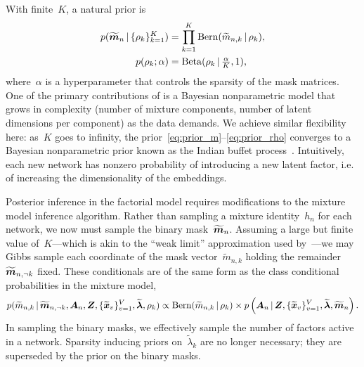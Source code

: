 With finite~$K$, a natural prior is
\begin{align}
  \label{eq:prior_m}
  p(\widetilde{\boldsymbol{m}}_n \, | \, \{\rho_k\}_{k=1}^K)
  &=\prod_{k=1}^K \mathrm{Bern}(\widetilde{m}_{n,k} \, | \, \rho_k), \\
  \label{eq:prior_rho}
  p(\rho_k; \alpha) &= \mathrm{Beta}(\rho_k \, | \, \tfrac{\alpha}{K}, 1), 
\end{align}
where~$\alpha$ is a hyperparameter that controls the sparsity of the
mask matrices.  One of the primary contributions of
\citet{durante2016nonparametric} is a Bayesian nonparametric model
that grows in complexity (number of mixture components, number of
latent dimensions per component) as the data demands.
We achieve similar flexibility here: as~$K$ goes to infinity, the 
prior~\eqref{eq:prior_m}--\eqref{eq:prior_rho} converges to a Bayesian
nonparametric prior known as the Indian buffet process~\citep{griffiths2005infinite}.
Intuitively, each new network has nonzero probability of introducing a
new latent factor, i.e. of increasing the dimensionality of the
embeddings.

Posterior inference in the factorial model requires
modifications to the mixture model inference algorithm. Rather than
sampling a mixture identity~$h_n$ for each network, we now must sample
the binary mask~$\widetilde{\boldsymbol{m}}_n$. Assuming a large but finite
value of~$K$---which is akin to the ``weak limit'' approximation used
by~\citet{durante2016nonparametric}---we may Gibbs sample each
coordinate of the mask vector~$\widetilde{m}_{n,k}$ holding the
remainder~$\widetilde{\boldsymbol{m}}_{n,\neg k}$ fixed.  These conditionals are
of the same form as the class conditional probabilities in the mixture
model,
\begin{multline}
  p(\widetilde{m}_{n,k} \, | \, \widetilde{\boldsymbol{m}}_{n, \neg k}, \boldsymbol{A}_n, \boldsymbol{Z},
  \{\widetilde{\boldsymbol{x}}_v\}_{v=1}^V, \widetilde{\boldsymbol{\lambda}},\rho_k) 
  \propto \mathrm{Bern}(\widetilde{m}_{n,k} \, | \, \rho_k) \times
  p\left(\boldsymbol{A}_n \, | \,
  \boldsymbol{Z}, \{\widetilde{\boldsymbol{x}}_v\}_{v=1}^V,
  \widetilde{\boldsymbol{\lambda}}, \widetilde{\boldsymbol{m}}_n \right).
\end{multline}
In sampling the binary masks, we effectively sample the number of
factors active in a network.  Sparsity inducing priors
on~$\widetilde{\lambda}_k$ are no longer necessary; they are
superseded by the prior on the binary masks.


